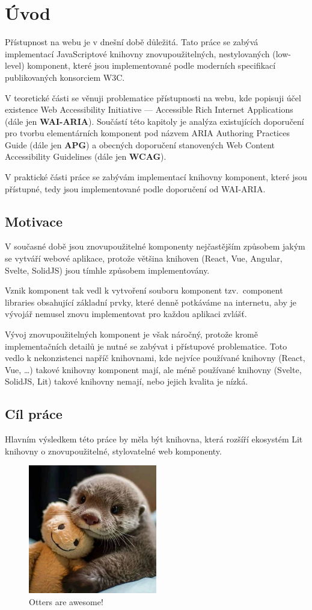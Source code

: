 \chapter{Úvod}

Přístupnost na webu je v dnešní době důležitá. Tato práce se zabývá implementací JavaScriptové knihovny
znovupoužitelných, nestylovaných (low-level) komponent, které jsou implementované podle moderních specifikací publikovaných konsorciem W3C.

V teoretické části se věnuji problematice přístupnosti na webu, kde popisuji účel existence
Web Accessibility Initiative --- Accessible Rich Internet Applications (dále jen \textbf{WAI-ARIA}).
Součástí této kapitoly je analýza existujících doporučení pro tvorbu elementárních
komponent pod názvem ARIA Authoring Practices Guide (dále jen \textbf{APG}) a
obecných doporučení stanovených Web Content Accessibility Guidelines (dále jen \textbf{WCAG}).

V praktické části práce se zabývám implementací knihovny komponent,
které jsou přístupné, tedy jsou implementované podle doporučení od WAI-ARIA.

\section{Motivace}

V současné době jsou znovupoužitelné komponenty nejčastějším způsobem jakým se vytváří webové aplikace, protože většina knihoven (React, Vue, Angular, Svelte, SolidJS) jsou tímhle způsobem implementovány.

Vznik komponent tak vedl k vytvoření souboru komponent tzv.\ component libraries obsahující základní prvky, které denně potkáváme na internetu, aby je vývojář nemusel znovu implementovat pro každou aplikaci zvlášť.

Vývoj znovupoužitelných komponent je však náročný, protože kromě implementačních detailů je nutné se zabývat i přístupové problematice. Toto vedlo k nekonzistenci napříč knihovnami, kde nejvíce používané knihovny (React, Vue, \dots) takové knihovny komponent mají, ale méně používané knihovny (Svelte, SolidJS, Lit) takové knihovny nemají, nebo jejich kvalita je nízká.

\section{Cíl práce}


Hlavním výsledkem této práce by měla být knihovna, která rozšíří ekosystém Lit knihovny o znovupoužitelné, stylovatelné web komponenty.


\begin{figure}
    \centering
    \includegraphics[width=0.5\textwidth]{./assets/figures/chapter-1/otter.jpg}
    \caption{Otters are awesome!}
\end{figure}
